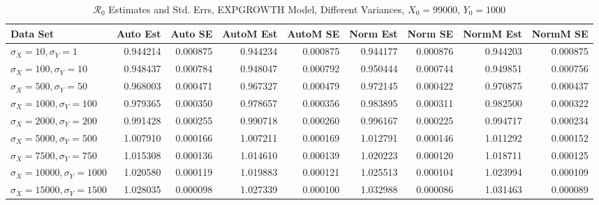 \documentclass[12pt]{article}
\newcommand{\rr}{\ensuremath{\mathcal{R}_0}}
\begin{document}
\begin{table}[H]
	
	\caption{$\rr$ Estimates and Std. Errs, EXPGROWTH Model, 
		Different Variances, $X_0 = 99000$, $Y_0 = 1000$}
	\begin{footnotesize}
		\hskip -1.7cm
		\begin{tabular}{l|r|r|r|r|r|r|r|r}
			\hline
			Data Set & Auto Est & Auto SE & AutoM Est & AutoM SE & Norm Est & Norm SE & NormM Est & NormM SE\\
			\hline
			$\sigma_X = 10, \sigma_Y = 1$ & 0.944214 & 0.000875 & 0.944234 & 0.000875 & 0.944177 & 0.000876 & 0.944203 & 0.000875\\
			\hline
			$\sigma_X = 100, \sigma_Y = 10$ & 0.948437 & 0.000784 & 0.948047 & 0.000792 & 0.950444 & 0.000744 & 0.949851 & 0.000756\\
			\hline
			$\sigma_X = 500, \sigma_Y = 50$ & 0.968003 & 0.000471 & 0.967327 & 0.000479 & 0.972145 & 0.000422 & 0.970875 & 0.000437\\
			\hline
			$\sigma_X = 1000, \sigma_Y = 100$ & 0.979365 & 0.000350 & 0.978657 & 0.000356 & 0.983895 & 0.000311 & 0.982500 & 0.000322\\
			\hline
			$\sigma_X = 2000, \sigma_Y = 200$ & 0.991428 & 0.000255 & 0.990718 & 0.000260 & 0.996167 & 0.000225 & 0.994717 & 0.000234\\
			\hline
			$\sigma_X = 5000, \sigma_Y = 500$ & 1.007910 & 0.000166 & 1.007211 & 0.000169 & 1.012791 & 0.000146 & 1.011292 & 0.000152\\
			\hline
			$\sigma_X = 7500, \sigma_Y = 750$ & 1.015308 & 0.000136 & 1.014610 & 0.000139 & 1.020223 & 0.000120 & 1.018711 & 0.000125\\
			\hline
			$\sigma_X = 10000, \sigma_Y = 1000$ & 1.020580 & 0.000119 & 1.019883 & 0.000121 & 1.025513 & 0.000104 & 1.023994 & 0.000109\\
			\hline
			$\sigma_X = 15000, \sigma_Y = 1500$ & 1.028035 & 0.000098 & 1.027339 & 0.000100 & 1.032988 & 0.000086 & 1.031463 & 0.000089\\
			\hline
		\end{tabular}
	\end{footnotesize}
\end{table}
\end{document}
